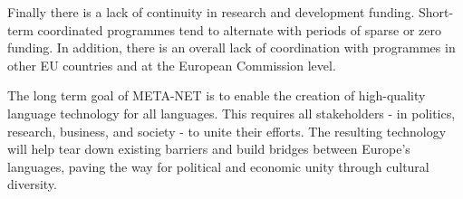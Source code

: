 \documentclass[]{../../metanetpaper}
\begin{document}
\begin{multicols}{2}
Finally there is a lack of continuity in research and development funding. Short-term coordinated programmes tend to alternate with periods of sparse or zero funding. In addition, there is an overall lack of coordination with programmes in other EU countries and at the European Commission level.

The long term goal of META-NET is to enable the creation of high-quality language technology for all languages. This requires all stakeholders - in politics, research, business, and society - to unite their efforts. The resulting technology will help tear down existing barriers and build bridges between Europe’s languages, paving the way for political and economic unity through cultural diversity. 
\end{multicols}

\clearpage
\end{document}
